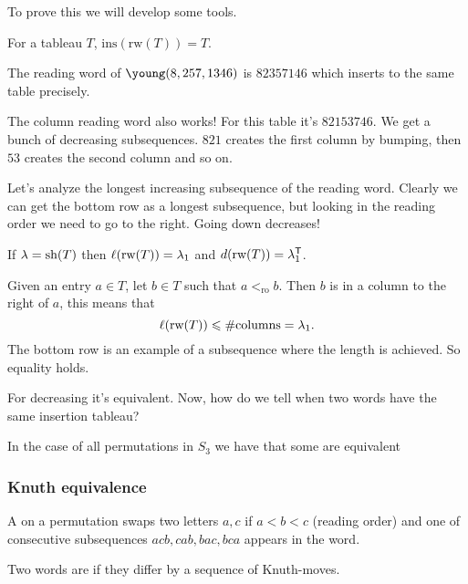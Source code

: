 \documentclass[12pt]{memoir}
\begin{document}
To prove this we will develop some tools.

\begin{Lem}\label{lem-reading-word}
    For a tableau $T$, $\text{ins}(\text{rw}(T))=T$.
\end{Lem}

The reading word of $\young(8,257,1346)$ is $82357146$ which inserts to the same table precisely.

\begin{Rmk}
    The column reading word also works! For this table it's $82153746$. We get a bunch of decreasing subsequences. $821$ creates the first column by bumping, then $53$ creates the second column and so on. 
\end{Rmk}

Let's analyze the longest increasing subsequence of the reading word. Clearly we can get the bottom row as a longest subsequence, but looking in the reading order we need to go to the right. Going down decreases!

\begin{Lem}
    If $\lambda=\text{sh}(T)$ then $\ell(\text{rw}(T))=\lambda_1$ and $d(\text{rw}(T))=\lambda_1^{\mathsf{T}}$.
\end{Lem}

\begin{ptcbp}
    Given an entry $a\in T$, let $b\in T$ such that $a<_{\text{ro}}b$. Then $b$ is in a column to the right of $a$, this means that 
    $$\ell(\text{rw}(T))\leqslant \#\text{columns}=\lambda_1.$$
    The bottom row is an example of a subsequence where the length is achieved. So equality holds.
\end{ptcbp}

For decreasing it's equivalent. Now, how do we tell when two words have the same insertion tableau?

\begin{Ex}
    In the case of all permutations in $S_3$ we have that some are equivalent 
\end{Ex}

\subsubsection{Knuth equivalence}

\begin{Def}
    A  on a permutation swaps two letters $a,c$ if $a<b<c$ (reading order) and one of consecutive subsequences $acb,cab,bac,bca$ appears in the word.\par 
    Two words are  if they differ by a sequence of Knuth-moves.
\end{Def}
\end{document}
